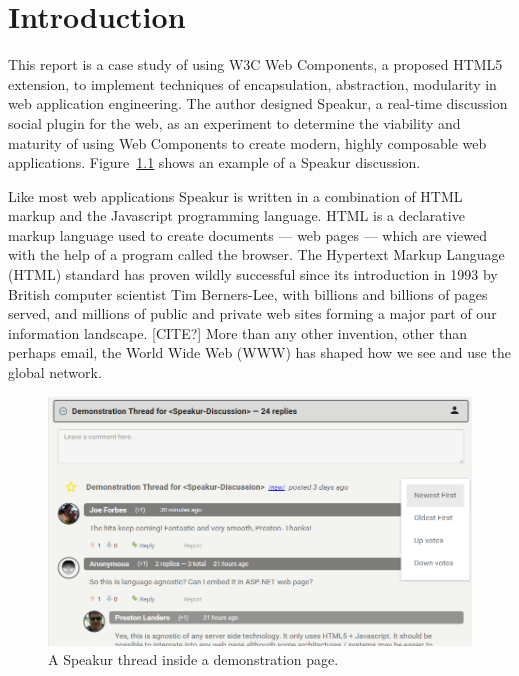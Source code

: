 \chapter{Introduction}
%

%
%

This report is a case study of using W3C Web Components, 
a proposed HTML5 extension,
to implement techniques of encapsulation, abstraction, modularity in web application engineering.
The author designed Speakur, a real-time discussion social plugin for the web, 
as an experiment to determine the viability and maturity of using Web Components to create modern, highly composable web applications. Figure~\ref{f:demo1} shows an example of a Speakur discussion.

Like most web applications Speakur is written in a combination of HTML markup and the Java\-script programming language. 
HTML is a declarative markup language used to create documents --- web pages --- which are viewed with the help of a program called the browser. 
The Hyper\-text Markup Language (HTML) 
standard has proven wildly successful since its introduction in 1993 by British computer scientist 
Tim Berners-Lee, 
with billions and billions of pages served, 
and millions of public and private web sites forming a major part of our information landscape. [CITE?]
More than any other invention, other than perhaps email, the World Wide Web (WWW) has shaped how we see and use the global network.

% 
\begin{figure}[htb]
\centering
 \includegraphics[width=6in]{images/screenshot_20150312_1630_v2.png}
\caption{A Speakur thread inside a demonstration page.}
\label{f:demo1}
\end{figure}
%

